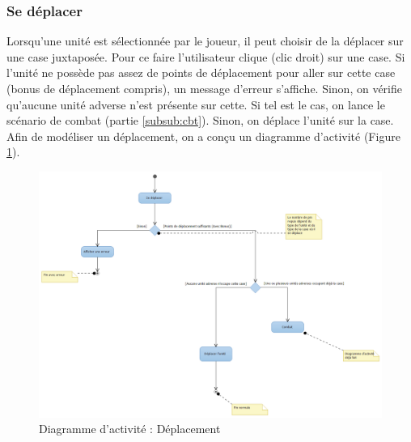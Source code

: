 \documentclass[a4paper,11pt]{article}
\begin{document}
\subsubsection{Se déplacer}
Lorsqu'une unité est sélectionnée par le joueur, il peut choisir de la déplacer sur une case juxtaposée. Pour ce faire l'utilisateur clique (clic droit) sur une case. Si l'unité ne possède pas assez de points de déplacement pour aller sur cette case (bonus de déplacement compris), un message d'erreur s'affiche. Sinon, on vérifie qu'aucune unité adverse n'est présente sur cette. Si tel est le cas, on lance le scénario de combat (partie \ref{subsub:cbt}). Sinon, on déplace l'unité sur la case.\\
Afin de modéliser un déplacement, on a conçu un diagramme d'activité (Figure \ref{da:dep}).
\begin{figure}[H]
	\centering
	\includegraphics[width=\textwidth]{fig/diagramme_activite_deplacerUnite}
	\caption{Diagramme d'activité : Déplacement}
	\label{da:dep}
\end{figure}   
\end{document}
